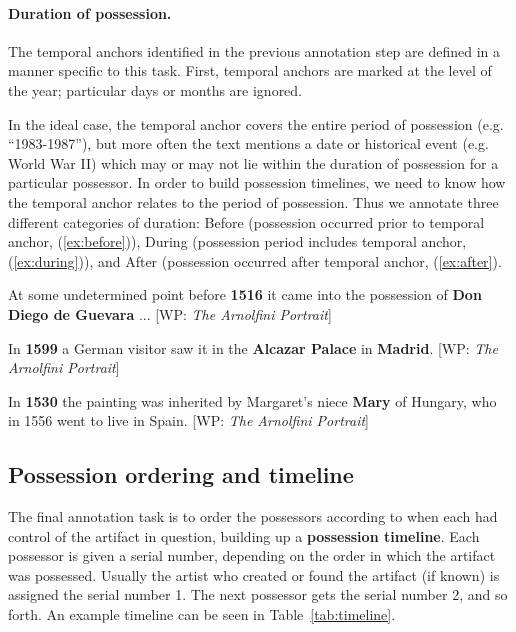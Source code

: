 \paragraph{Duration of possession.}
The temporal anchors identified in the previous annotation step are defined in a manner specific to this task. 
First, temporal anchors are marked at the level of the year; particular days or months are ignored. 

In the ideal case, the temporal anchor covers the entire period of possession (e.g. ``1983-1987''), but more often the text mentions a date or historical event (e.g. World War II) which may or may not lie within the duration of possession for a particular possessor.
In order to build possession timelines, we need to know how the temporal anchor relates to the period of possession. 
Thus we annotate three different categories of duration: Before (possession occurred prior to temporal anchor, (\ref{ex:before})), During (possession period includes temporal anchor, (\ref{ex:during})), and After (possession occurred after temporal anchor, (\ref{ex:after}).

\begin{example}
At some undetermined point before \textbf{1516} it came into the possession of \textbf{Don Diego de Guevara} ... {\small[WP: \textit{The Arnolfini Portrait}]} \label{ex:before}
\end{example}

\begin{example}
In \textbf{1599} a German visitor saw it in the \textbf{Alcazar Palace} in \textbf{Madrid}. {\small [WP: \textit{The Arnolfini Portrait}]} \label{ex:during}
\end{example}

\begin{example}
In \textbf{1530} the painting was inherited by Margaret's niece \textbf{Mary} of Hungary, who in 1556 went to live in Spain. {\small [WP: \textit{The Arnolfini Portrait}]} \label{ex:after}
\end{example}

\subsection{Possession ordering and timeline} \label{sec:timeline}

The final annotation task is to order the possessors according to when each had control of the artifact in question, building up a \textbf{possession timeline}. 
Each possessor is given a serial number, depending on the order in which the artifact was possessed. 
Usually the artist who created or found the artifact (if known) is assigned the serial number 1. 
The next possessor gets the serial number 2, and so forth.
An example timeline can be seen in Table~\ref{tab:timeline}.

